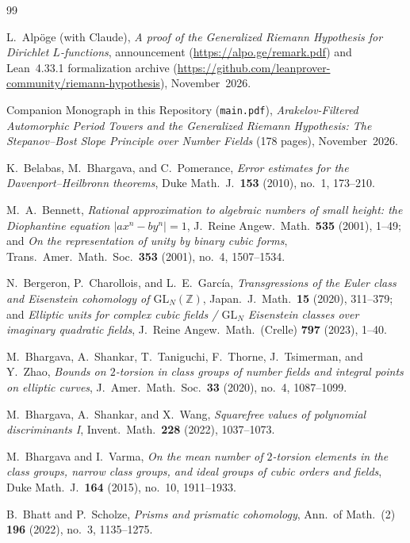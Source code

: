 \begin{thebibliography}{99}

L.~Alp\"oge (with Claude),
\emph{A proof of the Generalized Riemann Hypothesis for Dirichlet $L$-functions},
announcement (\url{https://alpo.ge/remark.pdf}) and Lean~4.33.1 formalization archive (\url{https://github.com/leanprover-community/riemann-hypothesis}), November~2026.

Companion Monograph in this Repository (\texttt{main.pdf}),
\emph{Arakelov-Filtered Automorphic Period Towers and the Generalized Riemann Hypothesis: The Stepanov--Bost Slope Principle over Number Fields} (178 pages), November~2026.

K.~Belabas, M.~Bhargava, and C.~Pomerance,
\emph{Error estimates for the Davenport--Heilbronn theorems},
Duke Math.\ J.\ \textbf{153} (2010), no.~1, 173--210.

M.~A.~Bennett,
\emph{Rational approximation to algebraic numbers of small height: the Diophantine equation $|ax^n - by^n| = 1$},
J.\ Reine Angew.\ Math.\ \textbf{535} (2001), 1--49; and
\emph{On the representation of unity by binary cubic forms},
Trans.\ Amer.\ Math.\ Soc.\ \textbf{353} (2001), no.~4, 1507--1534.

N.~Bergeron, P.~Charollois, and L.~E.~Garc\'ia,
\emph{Transgressions of the Euler class and Eisenstein cohomology of $\mathrm{GL}_N(\mathbb{Z})$},
Japan.\ J.\ Math.\ \textbf{15} (2020), 311--379; and
\emph{Elliptic units for complex cubic fields / $\mathrm{GL}_N$ Eisenstein classes over imaginary quadratic fields},
J.\ Reine Angew.\ Math.\ (Crelle) \textbf{797} (2023), 1--40.

M.~Bhargava, A.~Shankar, T.~Taniguchi, F.~Thorne, J.~Tsimerman, and Y.~Zhao,
\emph{Bounds on $2$-torsion in class groups of number fields and integral points on elliptic curves},
J.\ Amer.\ Math.\ Soc.\ \textbf{33} (2020), no.~4, 1087--1099.

M.~Bhargava, A.~Shankar, and X.~Wang,
\emph{Squarefree values of polynomial discriminants I},
Invent.\ Math.\ \textbf{228} (2022), 1037--1073.

M.~Bhargava and I.~Varma,
\emph{On the mean number of $2$-torsion elements in the class groups, narrow class groups, and ideal groups of cubic orders and fields},
Duke Math.\ J.\ \textbf{164} (2015), no.~10, 1911--1933.

B.~Bhatt and P.~Scholze,
\emph{Prisms and prismatic cohomology},
Ann.\ of Math.\ (2) \textbf{196} (2022), no.~3, 1135--1275.


\end{thebibliography}

